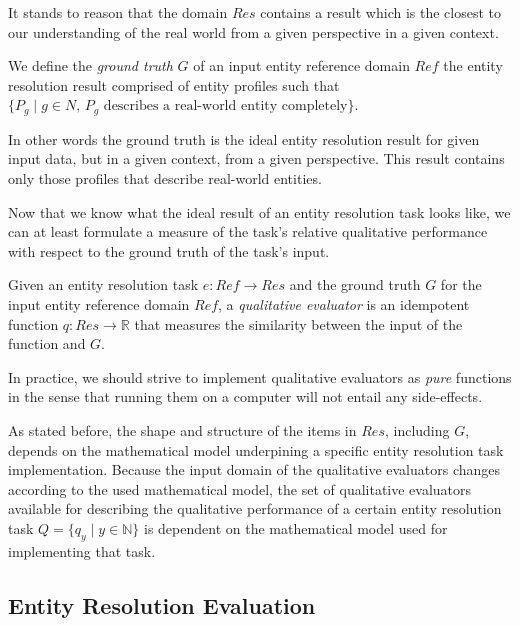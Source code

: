 \documentclass[11pt]{article}
\begin{document}
    It stands to reason that the domain $Res$ contains a result which is the
    closest to our understanding of the real world from a given perspective in
    a given context.

    \begin{defn}
        We define the \textit{ground truth} $G$ of an input entity reference
        domain $Ref$ the entity resolution result comprised of entity profiles
        such that
        $\{P_g \mid g \in N\textrm{, $P_g$ describes a real-world entity
        completely}\}$.
    \end{defn}

    In other words the ground truth is the ideal entity resolution result for 
    given input data, but in a given context, from a given perspective.
    This result contains only those profiles that describe real-world entities.

    Now that we know what the ideal result of an entity resolution task looks
    like, we can at least formulate a measure of the task's relative qualitative
    performance with respect to the ground truth of the task's input.
    
    \begin{defn}
    Given an entity resolution task $e: Ref \rightarrow Res$ and the ground
    truth $G$ for the input entity reference domain $Ref$, a \textit{qualitative
    evaluator} is an idempotent function $q: Res \rightarrow \mathbb{R}$ that
    measures the similarity between the input of the function and $G$.
    \end{defn}

    In practice, we should strive to implement qualitative evaluators as
    \textit{pure} functions in the sense that running them on a computer will
    not entail any side-effects.

    As stated before, the shape and structure of the items in $Res$, including
    $G$, depends on the mathematical model underpining a specific entity
    resolution task implementation.
    Because the input domain of the qualitative evaluators changes according to
    the used mathematical model, the set of qualitative evaluators available for
    describing the qualitative performance of a certain entity resolution task
    $Q = \{q_y \mid y \in \mathbb{N}\}$ is dependent on the mathematical model
    used for implementing that task.

    \subsection[ere]{Entity Resolution Evaluation}\label{sec:ere}
\end{document}
